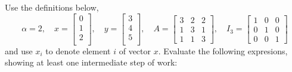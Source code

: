 \documentclass{article}
\def\blu#1{{\color{blu}#1}}
\begin{document}
Use the definitions below,
\[
\alpha = 2,\quad
x = \left[\begin{array}{c}
0\\
1\\
2\\
\end{array}\right], \quad
y = \left[\begin{array}{c}
3\\
4\\
5\\
\end{array}\right],\quad
A = \left[\begin{array}{ccc}
3 & 2 & 2\\
1 & 3 & 1\\
1 & 1 & 3
\end{array}\right],\quad
I_3 = \left[\begin{array}{ccc}
1 & 0 & 0\\
0 & 1 & 0\\
0 & 0 & 1
\end{array}\right]
\]
and use $x_i$ to denote element $i$ of vector $x$.
\blu{Evaluate the following expresions, showing at least one intermediate step of work}:
\end{document}
